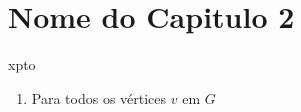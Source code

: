 \chapter{Nome do Capitulo 2}

\begin{algorithm}
\caption{ xpto}
\label{.....}
\begin{enumerate}
\item Para todos os vértices $v$ em $G$

\end{enumerate}
\end{algorithm} 









































